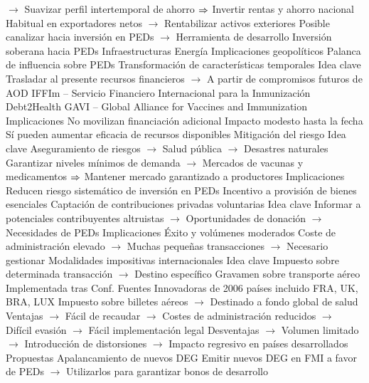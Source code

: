 \documentclass{nuevotema}
\begin{document}
\begin{esquemal}
				\4[] $\to$ Suavizar perfil intertemporal de ahorro
				\4[] $\Rightarrow$ Invertir rentas y ahorro nacional
				\4[] Habitual en exportadores netos
				\4[] $\to$ Rentabilizar activos exteriores
				\4[] Posible canalizar hacia inversión en PEDs
				\4[] $\to$ Herramienta de desarrollo
				\4 Inversión soberana hacia PEDs
				\4[] Infraestructuras
				\4[] Energía
				\4 Implicaciones geopolíticos
				\4[] Palanca de influencia sobre PEDs
			\3 Transformación de características temporales
				\4 Idea clave
				\4[] Trasladar al presente recursos financieros
				\4[] $\to$ A partir de compromisos futuros de AOD
				\4 IFFIm -- Servicio Financiero Internacional para la Inmunización
				\4 Debt2Health
				\4 GAVI -- Global Alliance for Vaccines and Immunization
				\4 Implicaciones
				\4[] No movilizan financiación adicional
				\4[] Impacto modesto hasta la fecha
				\4[] Sí pueden aumentar eficacia de recursos disponibles
			\3 Mitigación del riesgo
				\4 Idea clave
				\4[] Aseguramiento de riesgos
				\4[] $\to$ Salud pública
				\4[] $\to$ Desastres naturales
				\4[] Garantizar niveles mínimos de demanda
				\4[] $\to$ Mercados de vacunas y medicamentos
				\4[] $\Rightarrow$ Mantener mercado garantizado a productores
				\4 Implicaciones
				\4[] Reducen riesgo sistemático de inversión en PEDs
				\4[] Incentivo a provisión de bienes esenciales
			\3 Captación de contribuciones privadas voluntarias
				\4 Idea clave
				\4[] Informar a potenciales contribuyentes altruistas
				\4[] $\to$ Oportunidades de donación
				\4[] $\to$ Necesidades de PEDs
				\4 Implicaciones
				\4[] Éxito y volúmenes moderados
				\4[] Coste de administración elevado
				\4[] $\to$ Muchas pequeñas transacciones
				\4[] $\to$ Necesario gestionar
			\3 Modalidades impositivas internacionales
				\4 Idea clave
				\4[] Impuesto sobre determinada transacción
				\4[] $\to$ Destino específico
				\4 Gravamen sobre transporte aéreo
				\4[] Implementada tras Conf. Fuentes Innovadoras de 2006
				 países incluido FRA, UK, BRA, LUX
				\4[] Impuesto sobre billetes aéreos
				\4[] $\to$ Destinado a fondo global de salud
				\4 Ventajas
				\4[] $\to$ Fácil de recaudar
				\4[] $\to$ Costes de administración reducidos
				\4[] $\to$ Difícil evasión
				\4[] $\to$ Fácil implementación legal
				\4 Desventajas
				\4[] $\to$ Volumen limitado
				\4[] $\to$ Introducción de distorsiones
				\4[] $\to$ Impacto regresivo en países desarrollados
			\3 Propuestas
				\4 Apalancamiento de nuevos DEG
				\4[] Emitir nuevos DEG en FMI a favor de PEDs
				\4[] $\to$ Utilizarlos para garantizar bonos de desarrollo

\end{esquemal}
\end{document}
